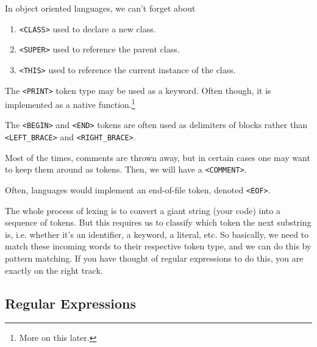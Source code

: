   \begin{example}[Classes]
    In object oriented languages, we can't forget about 
    \begin{enumerate}
      \item \texttt{<CLASS>} used to declare a new class. 
      \item \texttt{<SUPER>} used to reference the parent class. 
      \item \texttt{<THIS>} used to reference the current instance of the class. 
    \end{enumerate}
  \end{example}

  \begin{example}[Print]
    The \texttt{<PRINT>} token type may be used as a keyword. Often though, it is implemented as a native function.\footnote{More on this later.}
  \end{example}

  \begin{example}
    The \texttt{<BEGIN>} and \texttt{<END>} tokens are often used as delimiters of blocks rather than \texttt{<LEFT\_BRACE>} and \texttt{<RIGHT\_BRACE>}. 
  \end{example}

  \begin{example}[Comment]
    Most of the times, comments are thrown away, but in certain cases one may want to keep them around as tokens. Then, we will have a \texttt{<COMMENT>}. 
  \end{example}

  \begin{example}
    Often, languages would implement an end-of-file token, denoted \texttt{<EOF>}. 
  \end{example}

  The whole process of lexing is to convert a giant string (your code) into a sequence of tokens. But this requires us to classify which token the next substring is, i.e. whether it's an identifier, a keyword, a literal, etc. So basically, we need to match these incoming words to their respective token type, and we can do this by pattern matching. If you have thought of regular expressions to do this, you are exactly on the right track. 

\subsection{Regular Expressions} 

